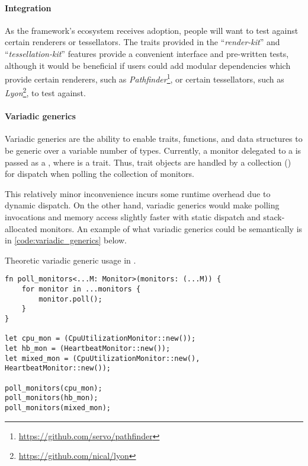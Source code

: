 \paragraph{Integration}
As the framework's ecosystem receives adoption, people will want to test against certain renderers or tessellators. The traits provided in the ``\textit{render-kit}'' and ``\textit{tessellation-kit}'' features provide a convenient interface and pre-written tests, although it would be beneficial if users could add modular dependencies which provide certain renderers, such as \textit{Pathfinder}\footnote{\href{https://github.com/servo/pathfinder}{https://github.com/servo/pathfinder}}, or certain tessellators, such as \textit{Lyon}\footnote{\href{https://github.com/nical/lyon}{https://github.com/nical/lyon}}, to test against.

\paragraph{Variadic generics}
Variadic generics are the ability to enable traits, functions, and data structures to be generic over a variable number of types. Currently, a monitor delegated to a  is passed as a , where  is a trait. Thus, trait objects are handled by a collection () for dispatch when polling the collection of monitors.\medskip

This relatively minor inconvenience incurs some runtime overhead due to dynamic dispatch. On the other hand, variadic generics would make polling invocations and memory access slightly faster with static dispatch and stack-allocated monitors. An example of what variadic generics could be semantically is in \cref{code:variadic_generics} below.

\begin{snippet}
\caption{Theoretic variadic generic usage in \toollinkedname.}\label{code:variadic_generics}
\begin{verbatim}
fn poll_monitors<...M: Monitor>(monitors: (...M)) {
    for monitor in ...monitors {
        monitor.poll();
    }
}

let cpu_mon = (CpuUtilizationMonitor::new());
let hb_mon = (HeartbeatMonitor::new());
let mixed_mon = (CpuUtilizationMonitor::new(), HeartbeatMonitor::new());

poll_monitors(cpu_mon);
poll_monitors(hb_mon);
poll_monitors(mixed_mon);
\end{verbatim}
\end{snippet}
\medskip

